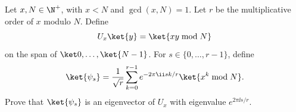 Let $x,N\in\N^+$, with $x<N$ and $\gcd(x,N)=1$.  Let $r$ be the multiplicative order of $x$ modulo $N$.  Define
$$
    U_x\ket{y}=\ket{xy\bmod N}
$$
on the span of $\ket0,\dots,\ket{N-1}$.  For $s\in\{0,\dots,r-1\}$, define
$$
    \ket{\psi_s}=\frac1{\sqrt r}\sum_{k=0}^{r-1}e^{-2\pi\ii sk/r}\ket{x^k\bmod N}.
$$
Prove that $\ket{\psi_s}$ is an eigenvector of $U_x$ with eigenvalue $e^{2\pi\ii s/r}$.
